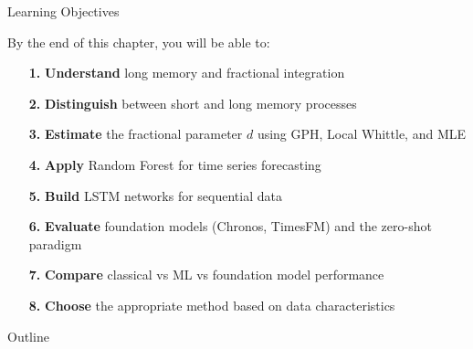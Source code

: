 \documentclass[9pt, aspectratio=169, t]{beamer}
\subtitle{Chapter 8: Modern Extensions}
\begin{document}
{
\begin{frame}
    \titlepage
\end{frame}
}

\begin{frame}{Learning Objectives}
    \begin{cminipage}{0.95\textwidth}
    \begin{block}{By the end of this chapter, you will be able to:}
        \begin{itemize}\setlength{\itemsep}{2pt}
            \item[\textcolor{MainBlue}{\textbf{1.}}] \textbf{Understand} long memory and fractional integration
            \item[\textcolor{MainBlue}{\textbf{2.}}] \textbf{Distinguish} between short and long memory processes
            \item[\textcolor{MainBlue}{\textbf{3.}}] \textbf{Estimate} the fractional parameter $d$ using GPH, Local Whittle, and MLE
            \item[\textcolor{MainBlue}{\textbf{4.}}] \textbf{Apply} Random Forest for time series forecasting
            \item[\textcolor{MainBlue}{\textbf{5.}}] \textbf{Build} LSTM networks for sequential data
            \item[\textcolor{MainBlue}{\textbf{6.}}] \textbf{Evaluate} foundation models (Chronos, TimesFM) and the zero-shot paradigm
            \item[\textcolor{MainBlue}{\textbf{7.}}] \textbf{Compare} classical vs ML vs foundation model performance
            \item[\textcolor{MainBlue}{\textbf{8.}}] \textbf{Choose} the appropriate method based on data characteristics
        \end{itemize}
    \end{block}
    \end{cminipage}
\end{frame}

\begin{frame}{Outline}
    \tableofcontents
\end{frame}
\end{document}
